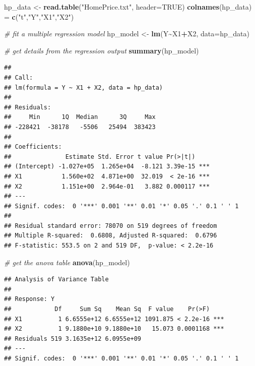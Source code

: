 \documentclass[
]{article}
\newenvironment{Shaded}{\begin{snugshade}}{\end{snugshade}}
\newcommand{\AttributeTok}[1]{\textcolor[rgb]{0.13,0.29,0.53}{#1}}
\newcommand{\CommentTok}[1]{\textcolor[rgb]{0.56,0.35,0.01}{\textit{#1}}}
\newcommand{\ConstantTok}[1]{\textcolor[rgb]{0.56,0.35,0.01}{#1}}
\newcommand{\FunctionTok}[1]{\textcolor[rgb]{0.13,0.29,0.53}{\textbf{#1}}}
\newcommand{\NormalTok}[1]{#1}
\newcommand{\OtherTok}[1]{\textcolor[rgb]{0.56,0.35,0.01}{#1}}
\newcommand{\SpecialCharTok}[1]{\textcolor[rgb]{0.81,0.36,0.00}{\textbf{#1}}}
\newcommand{\StringTok}[1]{\textcolor[rgb]{0.31,0.60,0.02}{#1}}
\begin{document}
\begin{Shaded}
\begin{Highlighting}[]
\NormalTok{hp\_data }\OtherTok{\textless{}{-}} \FunctionTok{read.table}\NormalTok{(}\StringTok{"HomePrice.txt"}\NormalTok{, }\AttributeTok{header=}\ConstantTok{TRUE}\NormalTok{)}
\FunctionTok{colnames}\NormalTok{(hp\_data) }\OtherTok{=} \FunctionTok{c}\NormalTok{(}\StringTok{"t"}\NormalTok{,}\StringTok{"Y"}\NormalTok{,}\StringTok{"X1"}\NormalTok{,}\StringTok{"X2"}\NormalTok{)}

\CommentTok{\# fit a multiple regression model}
\NormalTok{hp\_model }\OtherTok{\textless{}{-}} \FunctionTok{lm}\NormalTok{(Y}\SpecialCharTok{\textasciitilde{}}\NormalTok{X1}\SpecialCharTok{+}\NormalTok{X2, }\AttributeTok{data=}\NormalTok{hp\_data)}

\CommentTok{\# get details from the regression output}
\FunctionTok{summary}\NormalTok{(hp\_model)   }
\end{Highlighting}
\end{Shaded}

\begin{verbatim}
## 
## Call:
## lm(formula = Y ~ X1 + X2, data = hp_data)
## 
## Residuals:
##     Min      1Q  Median      3Q     Max 
## -228421  -38178   -5506   25494  383423 
## 
## Coefficients:
##               Estimate Std. Error t value Pr(>|t|)    
## (Intercept) -1.027e+05  1.265e+04  -8.121 3.39e-15 ***
## X1           1.560e+02  4.871e+00  32.019  < 2e-16 ***
## X2           1.151e+00  2.964e-01   3.882 0.000117 ***
## ---
## Signif. codes:  0 '***' 0.001 '**' 0.01 '*' 0.05 '.' 0.1 ' ' 1
## 
## Residual standard error: 78070 on 519 degrees of freedom
## Multiple R-squared:  0.6808, Adjusted R-squared:  0.6796 
## F-statistic: 553.5 on 2 and 519 DF,  p-value: < 2.2e-16
\end{verbatim}

\begin{Shaded}
\begin{Highlighting}[]
\CommentTok{\# get the anova table}
\FunctionTok{anova}\NormalTok{(hp\_model)}
\end{Highlighting}
\end{Shaded}

\begin{verbatim}
## Analysis of Variance Table
## 
## Response: Y
##            Df     Sum Sq    Mean Sq  F value    Pr(>F)    
## X1          1 6.6555e+12 6.6555e+12 1091.875 < 2.2e-16 ***
## X2          1 9.1880e+10 9.1880e+10   15.073 0.0001168 ***
## Residuals 519 3.1635e+12 6.0955e+09                       
## ---
## Signif. codes:  0 '***' 0.001 '**' 0.01 '*' 0.05 '.' 0.1 ' ' 1
\end{verbatim}
\end{document}
